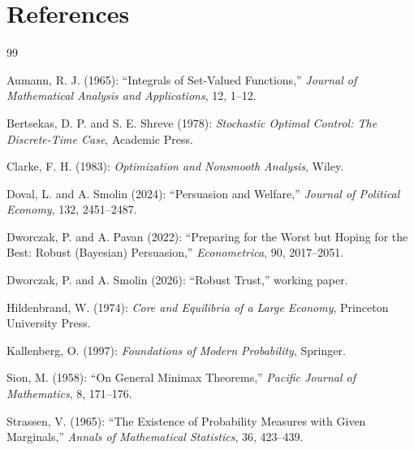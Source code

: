 \documentclass[11pt]{article}
\theoremstyle{definition}
\theoremstyle{remark}
\begin{document}
\section*{References}
\begin{thebibliography}{99}

Aumann, R. J. (1965): ``Integrals of Set-Valued Functions,'' \emph{Journal of Mathematical Analysis and Applications}, 12, 1--12.

Bertsekas, D. P. and S. E. Shreve (1978): \emph{Stochastic Optimal Control: The Discrete-Time Case}, Academic Press.

Clarke, F. H. (1983): \emph{Optimization and Nonsmooth Analysis}, Wiley.

Doval, L. and A. Smolin (2024): ``Persuasion and Welfare,'' \emph{Journal of Political Economy}, 132, 2451--2487.

Dworczak, P. and A. Pavan (2022): ``Preparing for the Worst but Hoping for the Best: Robust (Bayesian) Persuasion,'' \emph{Econometrica}, 90, 2017--2051.

Dworczak, P. and A. Smolin (2026): ``Robust Trust,'' working paper.

Hildenbrand, W. (1974): \emph{Core and Equilibria of a Large Economy}, Princeton University Press.

Kallenberg, O. (1997): \emph{Foundations of Modern Probability}, Springer.

Sion, M. (1958): ``On General Minimax Theorems,'' \emph{Pacific Journal of Mathematics}, 8, 171--176.

Strassen, V. (1965): ``The Existence of Probability Measures with Given Marginals,'' \emph{Annals of Mathematical Statistics}, 36, 423--439.

\end{thebibliography}
\end{document}
